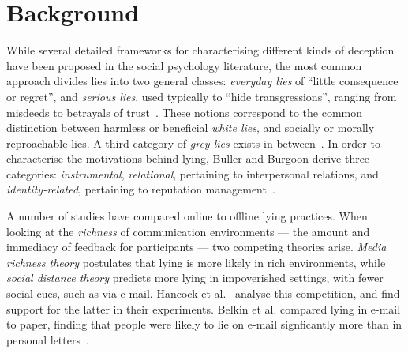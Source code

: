 \documentclass{sig-alternate}
\newcommand{\todo}[1]{\textbf{\color{red}TODO: #1}}
\begin{document}
\section{Background}

 
While several detailed frameworks for characterising different kinds of deception have been proposed in the social psychology literature, the most common approach divides lies into two general classes: \emph{everyday lies} of
``little consequence or regret'', and \emph{serious lies}, used typically to ``hide transgressions'', ranging from misdeeds to betrayals of trust~\cite{depaulo1996lying}. These notions correspond to the common distinction between harmless or beneficial \emph{white lies}, 
and socially or morally reproachable lies. A third category of \emph{grey lies} exists in between~\cite{camden1984white}.
In order to characterise the motivations behind lying, Buller and Burgoon derive three categories: \emph{instrumental}, \emph{relational}, pertaining to interpersonal relations, and \emph{identity-related}, pertaining to reputation management~\cite{buller1996testing}. 

A number of studies have compared online to offline lying practices. When looking at the \emph{richness} of communication environments --- the amount and immediacy of feedback for participants --- two competing theories arise. \emph{Media richness theory} postulates that lying is more likely in rich environments, while \emph{social distance theory} predicts more lying in impoverished settings, with fewer social cues, such as via e-mail.
Hancock et al.~\cite{hancock2004deception} analyse this competition, and  find support for the latter in their experiments.  
Belkin et al. compared lying in e-mail to paper, finding that people were likely to lie on e-mail signficantly more than in personal letters~\cite{naquin2010finer}.  
\end{document}
